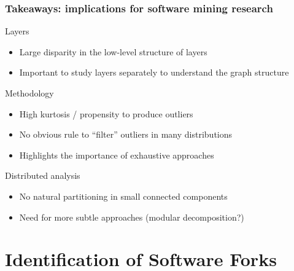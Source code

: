 \documentclass[aspectratio=169,xcolor=table]{beamer}
\begin{document}
    \begin{frame}
        \frametitle{Takeaways: implications for software mining research}

        \begin{block}{Layers}
            \begin{itemize}
                \item Large disparity in the low-level structure of layers
                \item Important to study layers separately to understand
                    the graph structure
            \end{itemize}
        \end{block}

        \begin{block}{Methodology}
            \begin{itemize}
                \item High kurtosis / propensity to produce outliers
                \item No obvious rule to ``filter'' outliers in many
                    distributions
                \item Highlights the importance of exhaustive approaches
            \end{itemize}
        \end{block}

        \begin{block}{Distributed analysis}
            \begin{itemize}
                \item No natural partitioning in small connected components
                \item Need for more subtle approaches (modular decomposition?)
            \end{itemize}
        \end{block}
    \end{frame}

    \section{Identification of Software Forks}
\end{document}
